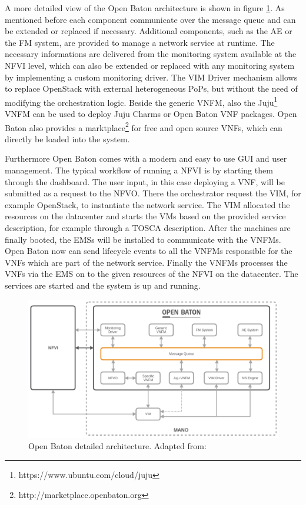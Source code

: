 A more detailed view of the Open Baton architecture is shown in figure \ref{fig:open_baton_detailed_architecture}.
As mentioned before each component communicate over the message queue and can be extended or replaced if necessary.
Additional components, such as the \ac{AE} or the \ac{FM} system, are provided to manage a network service at runtime.\cite{openBatonDoc}
The necessary informations are delivered from the monitoring system available at the \ac{NFVI} level, which can also be extended or replaced with any monitoring system by implementing a custom monitoring driver.\cite{openBatonDoc}
The \ac{VIM} Driver mechanism allows to replace OpenStack with external heterogeneous \acp{PoP}, but without the need of modifying the orchestration logic.\cite{openBatonDoc}
Beside the generic \ac{VNFM}, also the Juju\footnote{https://www.ubuntu.com/cloud/juju} \ac{VNFM} can be used to deploy Juju Charms or Open Baton \ac{VNF} packages.
Open Baton also provides a marktplace\footnote{http://marketplace.openbaton.org} for free and open source \acp{VNF}, which can directly be loaded into the system.

Furthermore Open Baton comes with a modern and easy to use \ac{GUI} and user management.
The typical workflow of running a \ac{NFVI} is by starting them through the dashboard.
The user input, in this case deploying a \ac{VNF}, will be submitted as a request to the \ac{NFVO}.
There the orchestrator request the \ac{VIM}, for example OpenStack, to instantiate the network service.
The \ac{VIM} allocated the resources on the datacenter and starts the \acp{VM} based on the provided service description, for example through a \ac{TOSCA} description.
After the machines are finally booted, the \acp{EMS} will be installed to communicate with the \acp{VNFM}.
Open Baton now can send lifecycle events to all the \acp{VNFM} responsible for the \acp{VNF} which are part of the network service.
Finally the \acp{VNFM} processes the \acp{VNF} via the \ac{EMS} on to the given resources of the \ac{NFVI} on the datacenter.
The services are started and the system is up and running.

\begin{figure}[H]
    \centering
    \includegraphics[width=\textwidth]{resources/images/open_baton_architecture.png}
    \caption[Open Baton detailed architecture]{Open Baton detailed architecture. Adapted from: \cite{openBatonDoc}}
    \label{fig:open_baton_detailed_architecture}
\end{figure}

